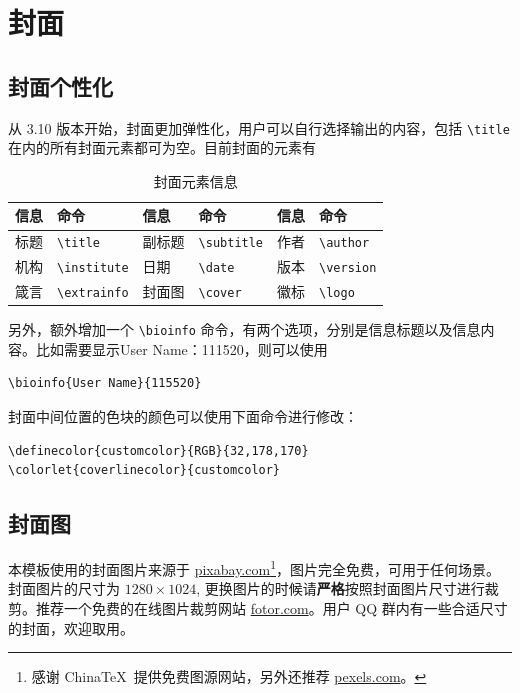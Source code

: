 \documentclass[lang=cn,10pt,scheme=chinese]{boyogalaelegantbook}
\begin{document}
\section{封面}

\subsection{封面个性化}

从 3.10 版本开始，封面更加弹性化，用户可以自行选择输出的内容，包括 \lstinline{\title} 在内的所有封面元素都可为空。目前封面的元素有

\begin{table}[htbp]
  \centering
  \caption{封面元素信息}
  \begin{tabular}{p{}p{}|p{}p{}|p{}p{}}
    \hline
    信息 & 命令 & 信息 & 命令 & 信息 & 命令 \\
    \hline
    标题 & \lstinline|\title| & 副标题 & \lstinline|\subtitle| & 作者 & \lstinline|\author| \\
    机构 & \lstinline|\institute| & 日期 &  \lstinline|\date| & 版本 & \lstinline|\version| \\
    箴言 & \lstinline|\extrainfo| & 封面图 & \lstinline|\cover| & 徽标 & \lstinline|\logo| \\
    \hline
  \end{tabular}
\end{table}

另外，额外增加一个 \lstinline{\bioinfo} 命令，有两个选项，分别是信息标题以及信息内容。比如需要显示{\kaishu User Name：111520}，则可以使用 
\begin{lstlisting}
\bioinfo{User Name}{115520}
\end{lstlisting}

封面中间位置的色块的颜色可以使用下面命令进行修改：
\begin{lstlisting}
\definecolor{customcolor}{RGB}{32,178,170}
\colorlet{coverlinecolor}{customcolor}
\end{lstlisting}

\subsection{封面图}

本模板使用的封面图片来源于 \href{https://pixabay.com/en/tea-time-poetry-coffee-reading-3240766/}{pixabay.com}\footnote{感谢 China\TeX\ 提供免费图源网站，另外还推荐 \href{https://www.pexels.com/}{pexels.com}。}，图片完全免费，可用于任何场景。封面图片的尺寸为 $1280 \times 1024$, 更换图片的时候请\textbf{严格}按照封面图片尺寸进行裁剪。推荐一个免费的在线图片裁剪网站 \href{https://www.fotor.com/cn}{fotor.com}。用户 QQ 群内有一些合适尺寸的封面，欢迎取用。
\end{document}
